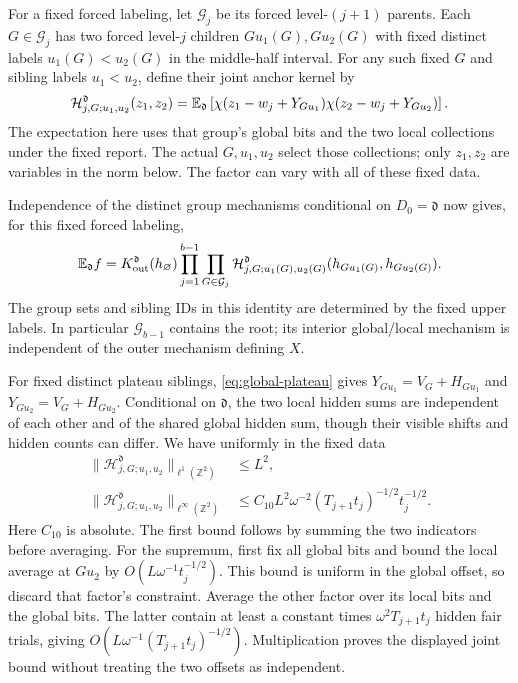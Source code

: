For a fixed forced labeling, let $\mathcal G_j$ be its forced level-$(j+1)$ parents.  Each $G\in\mathcal G_j$ has two forced level-$j$ children $Gu_1(G),Gu_2(G)$ with fixed distinct labels $u_1(G)<u_2(G)$ in the middle-half interval.  For any such fixed $G$ and sibling labels $u_1<u_2$, define their joint anchor kernel by
\begin{equation}\label{eq:joint-anchor}
 \mathcal H_{j,G;u_1,u_2}^{\mathfrak d}(z_1,z_2)
 =\mathbb E_{\mathfrak d}\left[
   \chi(z_1-w_j+Y_{Gu_1})\chi(z_2-w_j+Y_{Gu_2})\right].
\end{equation}
The expectation here uses that group's global bits and the two local collections under the fixed report.  The actual $G,u_1,u_2$ select those collections; only $z_1,z_2$ are variables in the norm below.  The factor can vary with all of these fixed data.

Independence of the distinct group mechanisms conditional on $D_0=\mathfrak d$ now gives, for this fixed forced labeling,
\begin{equation}\label{eq:anchor-factorization}
 \mathbb E_{\mathfrak d}f
 =K_{\rm out}^{\mathfrak d}(h_\varnothing)
   \prod_{j=1}^{b-1}\prod_{G\in\mathcal G_j}
   \mathcal H_{j,G;u_1(G),u_2(G)}^{\mathfrak d}
       (h_{Gu_1(G)},h_{Gu_2(G)}).
\end{equation}
The group sets and sibling IDs in this identity are determined by the fixed upper labels.  In particular $\mathcal G_{b-1}$ contains the root; its interior global/local mechanism is independent of the outer mechanism defining $X$.

For fixed distinct plateau siblings, \eqref{eq:global-plateau} gives
$Y_{Gu_1}=V_G+H_{Gu_1}$ and $Y_{Gu_2}=V_G+H_{Gu_2}$.  Conditional on $\mathfrak d$, the two local hidden sums are independent of each other and of the shared global hidden sum, though their visible shifts and hidden counts can differ.  We have uniformly in the fixed data
\begin{equation}\label{eq:joint-anchor-norms}
\begin{aligned}
 \|\mathcal H_{j,G;u_1,u_2}^{\mathfrak d}\|_{\ell^1(\mathbb Z^2)}&\le L^2,\\
 \|\mathcal H_{j,G;u_1,u_2}^{\mathfrak d}\|_{\ell^\infty(\mathbb Z^2)}
 &\le C_{10}L^2\omega^{-2}(T_{j+1}t_j)^{-1/2}t_j^{-1/2}.
\end{aligned}
\end{equation}
Here $C_{10}$ is absolute.  The first bound follows by summing the two indicators before averaging.  For the supremum, first fix all global bits and bound the local average at $Gu_2$ by $O(L\omega^{-1}t_j^{-1/2})$.  This bound is uniform in the global offset, so discard that factor's constraint.  Average the other factor over its local bits and the global bits.  The latter contain at least a constant times $\omega^2T_{j+1}t_j$ hidden fair trials, giving $O(L\omega^{-1}(T_{j+1}t_j)^{-1/2})$.  Multiplication proves the displayed joint bound without treating the two offsets as independent.

